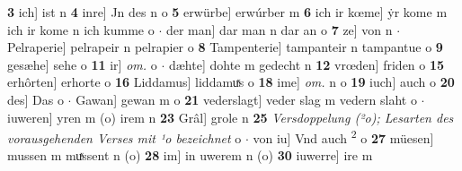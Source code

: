 \documentclass[8pt,a4paper,notitlepage]{article}
\begin{document}
\begin{table}[ht]
\begin{minipage}[t]{0.5\linewidth}
\textbf{3} ich] ist n \textbf{4} inre] Jn des n o \textbf{5} erwürbe] erwúrber m \textbf{6} ich ir kœme] ẏr kome m ich ir kome n ich kumme o  $\cdot$ der man] dar man n dar an o \textbf{7} ze] von n  $\cdot$ Pelraperie] pelrapeir n pelrapier o \textbf{8} Tampenterie] tampanteir n tampantue o \textbf{9} gesæhe] sehe o \textbf{11} ir] \textit{om.} o  $\cdot$ dæhte] dohte m gedecht n \textbf{12} vrœden] friden o \textbf{15} erhôrten] erhorte o \textbf{16} Liddamus] liddamuͯs o \textbf{18} ime] \textit{om.} n o \textbf{19} iuch] auch o \textbf{20} des] Das o  $\cdot$ Gawan] gewan m o \textbf{21} vederslagt] veder slag m vedern slaht o  $\cdot$ iuweren] yren m (o) irem n \textbf{23} Grâl] grole n \textbf{25} \textit{Versdoppelung (²o); Lesarten des vorausgehenden Verses mit ¹o bezeichnet} o   $\cdot$ von iu] Vnd auch \textsuperscript{2}\hspace{-1.3mm} o \textbf{27} müesen] mussen m muͯssent n (o) \textbf{28} im] in uwerem n (o) \textbf{30} iuwerre] ire m \newline
\end{minipage}
\end{table}
\newpage
\end{document}
